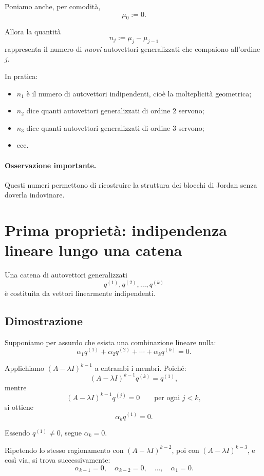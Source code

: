 Poniamo anche, per comodità,
\[
\mu_0 := 0.
\]

Allora la quantità
\begin{equation}
n_j := \mu_j - \mu_{j-1}
\label{eq:L8_n_j}
\end{equation}
rappresenta il numero di \emph{nuovi} autovettori generalizzati che compaiono all'ordine $j$.

In pratica:
\begin{itemize}
    \item $n_1$ è il numero di autovettori indipendenti, cioè la molteplicità geometrica;
    \item $n_2$ dice quanti autovettori generalizzati di ordine $2$ servono;
    \item $n_3$ dice quanti autovettori generalizzati di ordine $3$ servono;
    \item ecc.
\end{itemize}

\paragraph{Osservazione importante.}
Questi numeri permettono di ricostruire la struttura dei blocchi di Jordan senza doverla indovinare.

\section{Prima proprietà: indipendenza lineare lungo una catena}

Una catena di autovettori generalizzati
\[
q^{(1)}, q^{(2)}, \dots, q^{(k)}
\]
è costituita da vettori linearmente indipendenti.

\subsection*{Dimostrazione}

Supponiamo per assurdo che esista una combinazione lineare nulla:
\[
\alpha_1 q^{(1)} + \alpha_2 q^{(2)} + \cdots + \alpha_k q^{(k)} = 0.
\]

Applichiamo $(A-\lambda I)^{k-1}$ a entrambi i membri.  
Poiché:
\[
(A-\lambda I)^{k-1} q^{(k)} = q^{(1)},
\]
mentre
\[
(A-\lambda I)^{k-1} q^{(j)} = 0 \qquad \text{per ogni } j<k,
\]
si ottiene
\[
\alpha_k q^{(1)} = 0.
\]

Essendo $q^{(1)} \neq 0$, segue $\alpha_k = 0$.

Ripetendo lo stesso ragionamento con $(A-\lambda I)^{k-2}$, poi con $(A-\lambda I)^{k-3}$, e così via, si trova successivamente:
\[
\alpha_{k-1}=0,\quad \alpha_{k-2}=0,\quad \dots,\quad \alpha_1=0.
\]

